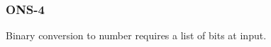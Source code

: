 \subsubsection{ONS-4}\label{sec:error_code_ons_4}

Binary conversion to number requires a list of bits at input.


